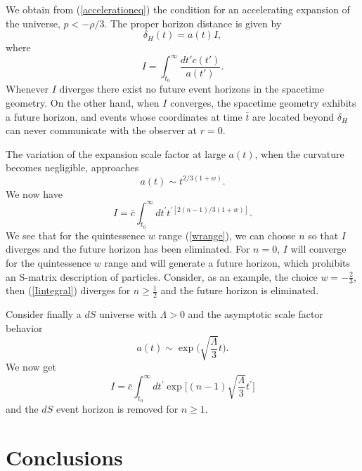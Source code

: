 \documentclass[a4paper,12pt]{article}
\begin{document}
We obtain from (\ref{accelerationeq}) the
condition for an accelerating expansion of the universe, $p< -\rho/3$. The
proper horizon distance is given by
\begin{equation}
\delta_H(t)=a(t)I,
\end{equation}
where
\begin{equation}
I=\int^\infty_{t_0}\frac{dt'c(t')}{a(t')}.
\end{equation}
Whenever $I$ diverges there exist no future event horizons
in the spacetime geometry. On the other hand, when $I$ converges, the
spacetime geometry exhibits a future horizon, and events whose coordinates
at time ${\bar t}$ are located beyond $\delta_H$ can never communicate with
the observer at $r=0$.

The variation of the expansion scale factor at large $a(t)$, when the
curvature becomes negligible, approaches
\begin{equation}
a(t)\sim t^{2/3(1+w)}.
\end{equation}
We now have
\begin{equation}
\label{Iintegral}
I={\bar c}\int^\infty_{t_0}dt^\prime t^{\prime[2(n-1)/3(1+w)]}.
\end{equation}
We see that for the quintessence $w$ range (\ref{wrange}), we can choose
$n$ so that $I$ diverges and the future horizon has been eliminated. For
$n=0$, $I$ will converge for the quintessence $w$ range and will generate a
future horizon, which prohibits an S-matrix description of particles.
Consider, as an example, the choice $w=-\frac{2}{3}$, then
(\ref{Iintegral}) diverges for $n\geq \frac{1}{2}$ and the future horizon
is eliminated.

Consider finally a $dS$ universe with $\Lambda > 0$ and the asymptotic
scale factor behavior
\begin{equation}
a(t)\sim\exp\biggl(\sqrt{\frac{\Lambda}{3}}t\biggr).
\end{equation}
We now get
\begin{equation}
I={\bar c}\int_{t_0}^\infty
dt^\prime\exp\biggl[(n-1)\sqrt{\frac{\Lambda}{3}}t^\prime\biggr]
\end{equation}
and the $dS$ event horizon is removed for $n\geq 1$.

\section{\bf Conclusions}
\end{document}
